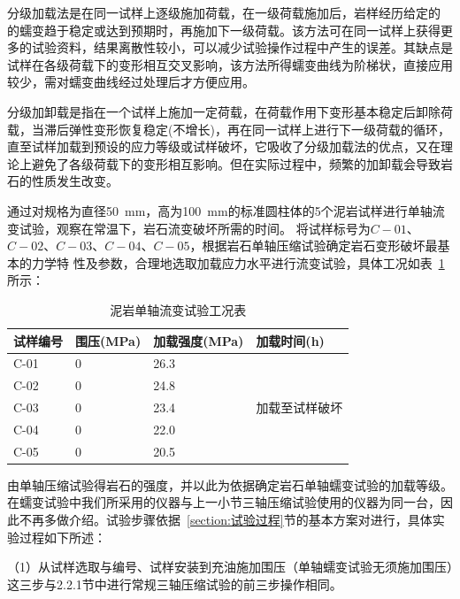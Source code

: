 分级加载法是在同一试样上逐级施加荷载，在一级荷载施加后，岩样经历给定的
的蠕变趋于稳定或达到预期时，再施加下一级荷载。该方法可在同一试样上获得更多的试验资料，结果离散性较小，可以减少试验操作过程中产生的误差。其缺点是试样在各级荷载下的变形相互交叉影响，该方法所得蠕变曲线为阶梯状，直接应用较少，需对蠕变曲线经过处理后才方便应用。

分级加卸载是指在一个试样上施加一定荷载，在荷载作用下变形基本稳定后卸除荷载，当滞后弹性变形恢复稳定(不增长)，再在同一试样上进行下一级荷载的循环，直至试样加载到预设的应力等级或试样破坏，它吸收了分级加载法的优点，又在理论上避免了各级荷载下的变形相互影响。但在实际过程中，频繁的加卸载会导致岩石的性质发生改变。

通过对规格为直径\SI{50}{mm}，高为\SI{100}{mm}的标准圆柱体的5个泥岩试样进行单轴流变试验，观察在常温下，岩石流变破坏所需的时间。
将试样标号为$C-01$、$C-02$、$C-03$、$C-04$、$C-05$，根据岩石单轴压缩试验确定岩石变形破坏最基本的力学特
性及参数，合理地选取加载应力水平进行流变试验，具体工况如表~\ref{tab:泥岩单轴流变试验工况表}所示：

\begin{table}[ht!]\small
    \centering
    \begin{tabular}{p{3cm}<{\centering} p{3cm}<{\centering} p{3cm}<{\centering} p{3cm}<{\centering}}
        \toprule
        试样编号  & 围压(MPa)  &  加载强度(MPa)   &  加载时间(h)\\
        \midrule
        C-01        & 0  &   26.3  &     \\ 
        C-02        & 0  &   24.8  &     \\ 
        C-03        & 0  &   23.4  &     加载至试样破坏\\
        C-04        & 0  &   22.0  &     \\
        C-05        & 0  &   20.5  &     \\
        \bottomrule
    \end{tabular}
    \caption{泥岩单轴流变试验工况表}
    \label{tab:泥岩单轴流变试验工况表}
\end{table}




由单轴压缩试验得岩石的强度，并以此为依据确定岩石单轴蠕变试验的加载等级。
在蠕变试验中我们所采用的仪器与上一小节三轴压缩试验使用的仪器为同一台，因此不再多做介绍。试验步骤依据~\ref{section:试验过程}节的基本方案对进行，具体实验过程如下所述：

（1）从试样选取与编号、试样安装到充油施加围压（单轴蠕变试验无须施加围压）这三步与2.2.1节中进行常规三轴压缩试验的前三步操作相同。

